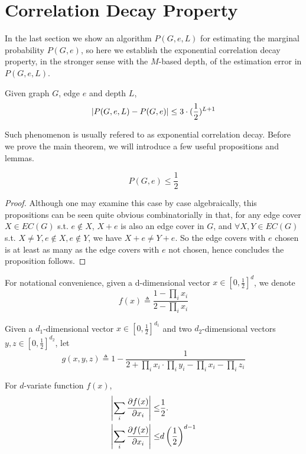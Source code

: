 \section{Correlation Decay Property}

In the last section we show an algorithm $P(G,e,L)$ for estimating the marginal probability $P(G,e)$,
so here we establish the exponential correlation decay property, in the stronger sense with the $M$-based depth, of the estimation error in $P(G,e,L)$.%

\begin{Thm}
	Given graph $G$, edge $e$ and depth $L$,
	\[\left\vert P(G,e,L) - P(G,e)\right\vert \leq 3\cdot(\frac{1}{2})^{L+1}\]
\end{Thm}

Such phenomenon is usually refered to as exponential correlation decay. Before we prove the main theorem, we will introduce a few useful propositions and lemmas.

\begin{Prop}
	\[P(G, e) \leq \frac{1}{2}\]
\end{Prop}

\begin{proof}
	Although one may examine this case by case algebraically, this propositions can be seen quite obvious combinatorially in that, for any edge cover $X \in EC(G)$ s.t. $e \notin X$, $X+e$ is also an edge cover in $G$, and $\forall X,Y \in EC(G)$ s.t. $X \neq Y, e \notin X, e\notin Y$, we have $X+e \neq Y+e$. So the edge covers with $e$ chosen is at least as many as the edge covers with $e$ not chosen, hence concludes the proposition follows.
\end{proof}

For notational convenience, given a d-dimensional vector $x \in [0, \frac{1}{2}]^d$, we denote
\[ f(x) \triangleq \frac{1- \prod_i x_i}{2 - \prod_i x_i}\]

Given a $d_1$-dimensional vector $x \in [0, \frac{1}{2}]^{d_1}$ and two $d_2$-dimensional vectors $y,z \in [0, \frac{1}{2}]^{d_2}$, let
\[ g(x,y,z) \triangleq  1- \frac{1}{2+\prod_i x_i \cdot \prod_i y_i - \prod_i x_i - \prod_i z_i} \]


	\begin{Lem}
		For $d$-variate function $f(x)$,
		\begin{align*}
			\left\vert\sum_i \cfrac{\partial f(x)}{\partial x_i}\right\vert \leq & \frac{1}{2}. \\
			\left\vert\sum_i \cfrac{\partial f(x)}{\partial x_i}\right\vert \leq & d \left( \frac{1}{2} \right)^{d-1}
		\end{align*}
	\end{Lem}

